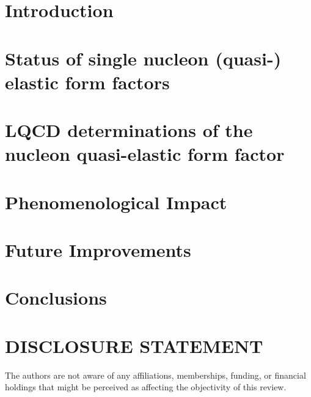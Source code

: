 \documentclass{ar-1col}
\begin{document}
\tableofcontents


\section{Introduction\label{sec:intro}}



\section{Status of single nucleon (quasi-) elastic form factors\label{sec:sof}}


\section{LQCD determinations of the nucleon quasi-elastic form factor\label{sec:lqcd}}



\section{Phenomenological Impact\label{sec:impact}}



\section{Future Improvements\label{sec:future}}



\section{Conclusions\label{sec:conclusions}}



\section*{DISCLOSURE STATEMENT}
The authors are not aware of any affiliations, memberships, funding, or financial holdings that might be perceived as affecting the objectivity of this review.
\end{document}
